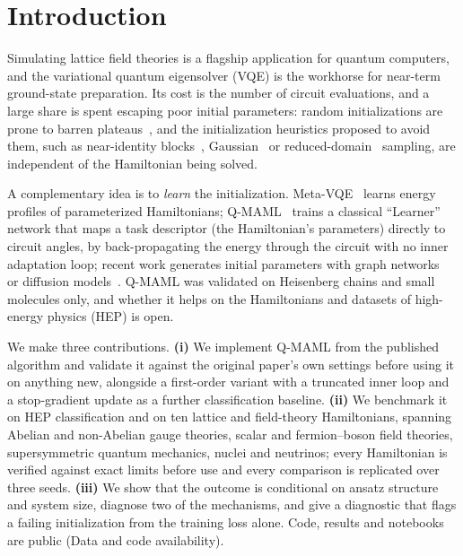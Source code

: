\documentclass[pdflatex,sn-mathphys-num]{sn-jnl}
\begin{document}
\section{Introduction}\label{sec:intro}

Simulating lattice field theories is a flagship application for quantum computers, and the variational quantum eigensolver (VQE) is the workhorse for near-term ground-state preparation. Its cost is the number of circuit evaluations, and a large share is spent escaping poor initial parameters: random initializations are prone to barren plateaus~\cite{mcclean2018barren,cerezo2021costfunction}, and the initialization heuristics proposed to avoid them, such as near-identity blocks~\cite{grant2019initialization}, Gaussian~\cite{zhang2022escaping} or reduced-domain~\cite{wang2023trainability} sampling, are independent of the Hamiltonian being solved.

A complementary idea is to \emph{learn} the initialization. Meta-VQE~\cite{cerveralierta2021metavqe} learns energy profiles of parameterized Hamiltonians; Q-MAML~\cite{leeqmaml2025} trains a classical ``Learner'' network that maps a task descriptor (the Hamiltonian's parameters) directly to circuit angles, by back-propagating the energy through the circuit with no inner adaptation loop; recent work generates initial parameters with graph networks~\cite{qracle2025} or diffusion models~\cite{diffq2025}. Q-MAML was validated on Heisenberg chains and small molecules only, and whether it helps on the Hamiltonians and datasets of high-energy physics (HEP) is open.

We make three contributions. \textbf{(i)} We implement Q-MAML from the published algorithm and validate it against the original paper's own settings before using it on anything new, alongside a first-order variant with a truncated inner loop and a stop-gradient update as a further classification baseline. \textbf{(ii)} We benchmark it on HEP classification and on ten lattice and field-theory Hamiltonians, spanning Abelian and non-Abelian gauge theories, scalar and fermion--boson field theories, supersymmetric quantum mechanics, nuclei and neutrinos; every Hamiltonian is verified against exact limits before use and every comparison is replicated over three seeds. \textbf{(iii)} We show that the outcome is conditional on ansatz structure and system size, diagnose two of the mechanisms, and give a diagnostic that flags a failing initialization from the training loss alone. Code, results and notebooks are public (Data and code availability).
\end{document}
